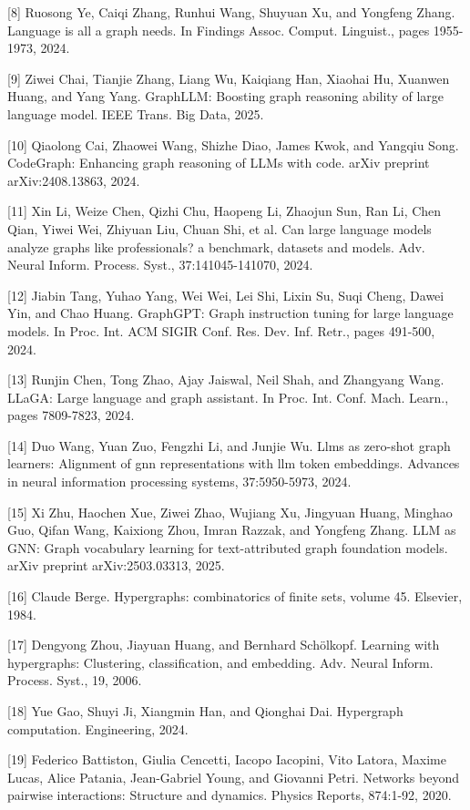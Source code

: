 \documentclass[10pt]{article}
\begin{document}
{[}8{]} Ruosong Ye, Caiqi Zhang, Runhui Wang, Shuyuan Xu, and Yongfeng Zhang. Language is all a graph needs. In Findings Assoc. Comput. Linguist., pages 1955-1973, 2024.

{[}9{]} Ziwei Chai, Tianjie Zhang, Liang Wu, Kaiqiang Han, Xiaohai Hu, Xuanwen Huang, and Yang Yang. GraphLLM: Boosting graph reasoning ability of large language model. IEEE Trans. Big Data, 2025.

{[}10{]} Qiaolong Cai, Zhaowei Wang, Shizhe Diao, James Kwok, and Yangqiu Song. CodeGraph: Enhancing graph reasoning of LLMs with code. arXiv preprint arXiv:2408.13863, 2024.

{[}11{]} Xin Li, Weize Chen, Qizhi Chu, Haopeng Li, Zhaojun Sun, Ran Li, Chen Qian, Yiwei Wei, Zhiyuan Liu, Chuan Shi, et al. Can large language models analyze graphs like professionals? a benchmark, datasets and models. Adv. Neural Inform. Process. Syst., 37:141045-141070, 2024.

{[}12{]} Jiabin Tang, Yuhao Yang, Wei Wei, Lei Shi, Lixin Su, Suqi Cheng, Dawei Yin, and Chao Huang. GraphGPT: Graph instruction tuning for large language models. In Proc. Int. ACM SIGIR Conf. Res. Dev. Inf. Retr., pages 491-500, 2024.

{[}13{]} Runjin Chen, Tong Zhao, Ajay Jaiswal, Neil Shah, and Zhangyang Wang. LLaGA: Large language and graph assistant. In Proc. Int. Conf. Mach. Learn., pages 7809-7823, 2024.

{[}14{]} Duo Wang, Yuan Zuo, Fengzhi Li, and Junjie Wu. Llms as zero-shot graph learners: Alignment of gnn representations with llm token embeddings. Advances in neural information processing systems, 37:5950-5973, 2024.

{[}15{]} Xi Zhu, Haochen Xue, Ziwei Zhao, Wujiang Xu, Jingyuan Huang, Minghao Guo, Qifan Wang, Kaixiong Zhou, Imran Razzak, and Yongfeng Zhang. LLM as GNN: Graph vocabulary learning for text-attributed graph foundation models. arXiv preprint arXiv:2503.03313, 2025.

{[}16{]} Claude Berge. Hypergraphs: combinatorics of finite sets, volume 45. Elsevier, 1984.

{[}17{]} Dengyong Zhou, Jiayuan Huang, and Bernhard Schölkopf. Learning with hypergraphs: Clustering, classification, and embedding. Adv. Neural Inform. Process. Syst., 19, 2006.

{[}18{]} Yue Gao, Shuyi Ji, Xiangmin Han, and Qionghai Dai. Hypergraph computation. Engineering, 2024.

{[}19{]} Federico Battiston, Giulia Cencetti, Iacopo Iacopini, Vito Latora, Maxime Lucas, Alice Patania, Jean-Gabriel Young, and Giovanni Petri. Networks beyond pairwise interactions: Structure and dynamics. Physics Reports, 874:1-92, 2020.
\end{document}
